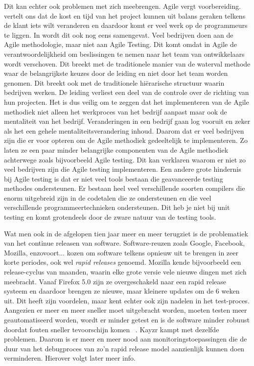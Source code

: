Dit kan echter ook problemen met zich meebrengen. Agile vergt voorbereiding. \textcite{CHAKRAVORTY2014536} vertelt ons dat de kost en tijd van het project kunnen uit balans geraken telkens de klant iets wilt veranderen en daardoor komt er veel werk op de programmeurs te liggen. In \autocite{Borland2012} wordt dit ook nog eens samengevat. Veel bedrijven doen aan de Agile methodologie, maar niet aan Agile Testing. Dit komt omdat in Agile de verantwoordelijkheid om beslissingen te nemen naar het team van ontwikkelaars wordt verschoven. Dit breekt met de traditionele manier van de waterval methode waar de belangrijkste keuzes door de leiding en niet door het team worden genomen. Dit breekt ook met de traditionele hiërarische structuur waarin bedrijven werken. De leiding verliest een deel van de controle over de richting van hun projecten. Het is dus veilig om te zeggen dat het implementeren van de Agile methodiek niet alleen het werkproces van het bedrijf aanpast maar ook de mentaliteit van het bedrijf. Veranderingen in een bedrijf gaan log vooruit en zeker als het een gehele mentaliteitsverandering inhoud. Daarom dat er veel bedrijven zijn die er voor opteren om de Agile methodiek gedeeltelijk te implementeren. Zo laten ze een paar minder belangrijke componenten van de Agile methodiek achterwege zoals bijvoorbeeld Agile testing. Dit kan verklaren waarom er niet zo veel bedrijven zijn die Agile testing implementeren. Een andere grote hindernis bij Agile testing is dat er niet veel tools bestaan die geavanceerde testing methodes ondersteunen. Er bestaan heel veel verschillende soorten compilers die enorm uitgebreid zijn in de codetalen die ze ondersteunen en die veel verschillende programmeertechnieken ondersteunen. Dit heb je niet bij unit testing en komt grotendeels door de zware natuur van de testing tools.

Wat men ook in de afgelopen tien jaar meer en meer terugziet is de problematiek van het continue releasen van software. Software-reuzen zoals Google, Facebook, Mozilla, enzovoort... kozen om software telkens opnieuw uit te brengen in zeer korte periodes, ook wel \textit{rapid releases} genoemd. Mozilla kende bijvoorbeeld een release-cyclus van maanden, waarin elke grote versie vele nieuwe dingen met zich meebracht. Vanaf Firefox 5.0 zijn ze overgeschakeld naar een rapid release systeem en daardoor brengen ze nieuwe, maar kleinere updates om de 6 weken uit. Dit heeft zijn voordelen, maar kent echter ook zijn nadelen in het test-proces. Aangezien er meer en meer sneller moet uitgebracht worden, moeten testen meer geautomatiseerd worden, wordt er minder getest en is de software minder robuust doordat fouten sneller tevoorschijn komen ~\autocite{Maentylae2013}. Kayzr kampt met dezelfde problemen. Daarom is er meer en meer nood aan monitoringstoepassingen die de duur van het debugproces van zo'n rapid release model aanzienlijk kunnen doen verminderen. Hierover volgt later meer info. 

